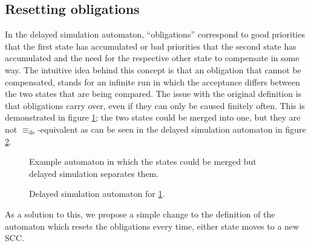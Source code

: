 \subsection{Resetting obligations} 
In the delayed simulation automaton, \enquote{obligations} correspond to good priorities that the first state has accumulated or bad priorities that the second state has accumulated and the need for the respective other state to compensate in some way. The intuitive idea behind this concept is that an obligation that cannot be compensated, stands for an infinite run in which the acceptance differs between the two states that are being compared. The issue with the original definition is that obligations carry over, even if they can only be caused finitely often. This is demonstrated in figure \ref{fig:fritzwilke:reset_oblig_example}; the two states could be merged into one, but they are not $\equiv_\text{de}$-equivalent as can be seen in the delayed simulation automaton in figure \ref{fig:fritzwilke:reset_oblig_example_dea}.

\begin{figure}
\centering
{}
\caption{Example automaton in which the states could be merged but delayed simulation separates them.}
\label{fig:fritzwilke:reset_oblig_example}
\end{figure}

\begin{figure}
\centering
{}
\caption{Delayed simulation automaton for \ref{fig:fritzwilke:reset_oblig_example}.}
\label{fig:fritzwilke:reset_oblig_example_dea}
\end{figure}

As a solution to this, we propose a simple change to the definition of the automaton which resets the obligations every time, either state moves to a new SCC. 

